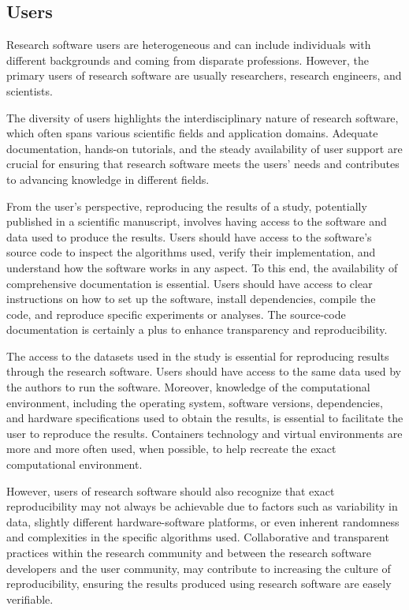 \subsection{Users}

Research software users are heterogeneous and can include individuals with different backgrounds and coming from disparate professions. However, the primary users of research software are usually researchers, research engineers, and scientists. 

The diversity of users highlights the interdisciplinary nature of research software, which often spans various scientific fields and application domains. Adequate documentation, hands-on tutorials, and the steady availability of user support are crucial for ensuring that research software meets the users' needs and contributes to advancing knowledge in different fields.  

From the user's perspective, reproducing the results of a study, potentially published in a scientific manuscript, involves having access to the software and data used to produce the results. 
Users should have access to the software's source code to inspect the algorithms used, verify their implementation, and understand how the software works in any aspect.
To this end, the availability of comprehensive documentation is essential. Users should have access to clear instructions on how to set up the software, install dependencies, compile the code, and reproduce specific experiments or analyses. The source-code documentation is certainly a plus to enhance transparency and reproducibility.

The access to the datasets used in the study is essential for reproducing results through the research software. Users should have access to the same data used by the authors to run the software. Moreover, knowledge of the computational environment, including the operating system, software versions, dependencies, and hardware specifications used to obtain the results, is essential to facilitate the user to reproduce the results. Containers technology and virtual environments are more and more often used, when possible, to help recreate the exact computational environment.

However, users of research software should also recognize that exact reproducibility may not always be achievable due to factors such as variability in data, slightly different hardware-software platforms, or even inherent randomness and complexities in the specific algorithms used. 
Collaborative and transparent practices within the research community and between the research software developers and the user community, may contribute to increasing the culture of reproducibility, ensuring the results produced using research software are easely verifiable.


